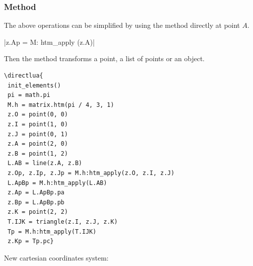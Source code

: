 \subsubsection{Method }
\label{ssub:method_code_htm__apply}
The above operations can be simplified by using the  method directly at point $A$.

\begin{mybox}
|z.Ap = M: htm_apply (z.A)|\\
\end{mybox}

Then the method  transforms a point, a list of points or an object.


\begin{minipage}{.6\textwidth}
\begin{verbatim}
\directlua{
 init_elements()
 pi = math.pi
 M.h = matrix.htm(pi / 4, 3, 1)
 z.O = point(0, 0)
 z.I = point(1, 0)
 z.J = point(0, 1)
 z.A = point(2, 0)
 z.B = point(1, 2)
 L.AB = line(z.A, z.B)
 z.Op, z.Ip, z.Jp = M.h:htm_apply(z.O, z.I, z.J)
 L.ApBp = M.h:htm_apply(L.AB)
 z.Ap = L.ApBp.pa
 z.Bp = L.ApBp.pb
 z.K = point(2, 2)
 T.IJK = triangle(z.I, z.J, z.K)
 Tp = M.h:htm_apply(T.IJK)
 z.Kp = Tp.pc}
\end{verbatim}
\end{minipage}
\begin{minipage}{.4\textwidth}
\end{minipage}

\vspace{.5 em}

New  cartesian coordinates system:

